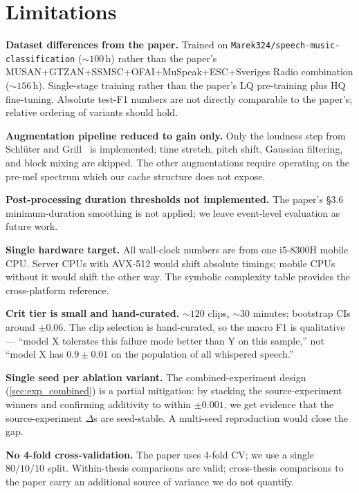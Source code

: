 \section{Limitations}
\label{sec:conclusion_limitations}

\textbf{Dataset differences from the paper.}
Trained on \texttt{Marek324/speech-music-classification} ($\sim 100$\,h) rather than the paper's MUSAN+GTZAN+SSMSC+OFAI+MuSpeak+ESC+Sveriges Radio combination ($\sim 156$\,h).
Single-stage training rather than the paper's LQ pre-training plus HQ fine-tuning.
Absolute test-F1 numbers are not directly comparable to the paper's; relative ordering of variants should hold.

\textbf{Augmentation pipeline reduced to gain only.}
Only the loudness step from Schl\"uter and Grill~\cite{schluter2015augmentation} is implemented; time stretch, pitch shift, Gaussian filtering, and block mixing are skipped.
The other augmentations require operating on the pre-mel spectrum which our cache structure does not expose.

\textbf{Post-processing duration thresholds not implemented.}
The paper's §3.6 minimum-duration smoothing is not applied; we leave event-level evaluation as future work.

\textbf{Single hardware target.}
All wall-clock numbers are from one i5-8300H mobile CPU.
Server CPUs with AVX-512 would shift absolute timings; mobile CPUs without it would shift the other way.
The symbolic complexity table provides the cross-platform reference.

\textbf{Crit tier is small and hand-curated.}
$\sim 120$ clips, $\sim 30$ minutes; bootstrap CIs around $\pm 0.06$.
The clip selection is hand-curated, so the macro F1 is qualitative — ``model X tolerates this failure mode better than Y on this sample,'' not ``model X has $0.9 \pm 0.01$ on the population of all whispered speech.''

\textbf{Single seed per ablation variant.}
The combined-experiment design (\cref{sec:exp_combined}) is a partial mitigation: by stacking the source-experiment winners and confirming additivity to within $\pm 0.001$, we get evidence that the source-experiment $\Delta$s are seed-stable.
A multi-seed reproduction would close the gap.

\textbf{No 4-fold cross-validation.}
The paper uses 4-fold CV; we use a single $80/10/10$ split.
Within-thesis comparisons are valid; cross-thesis comparisons to the paper carry an additional source of variance we do not quantify.

